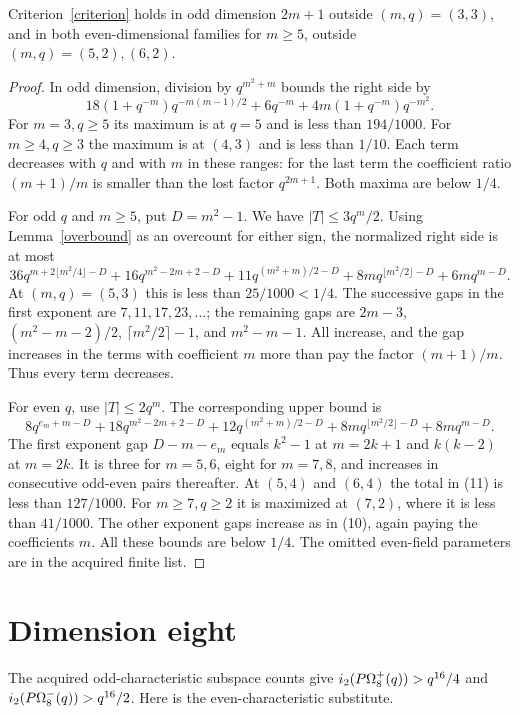 \documentclass[11pt,a4paper]{article}
\begin{document}
\begin{proposition}\label{uniform}
Criterion~\eqref{criterion} holds in odd dimension $2m+1$ outside
$(m,q)=(3,3)$, and in both even-dimensional families for $m\ge5$,
outside $(m,q)=(5,2),(6,2)$.
\end{proposition}
\begin{proof}
In odd dimension, division by $q^{m^2+m}$ bounds the right side by
\[
 18(1+q^{-m})q^{-m(m-1)/2}+6q^{-m}
                 +4m(1+q^{-m})q^{-m^2}.                       \tag{9}
\]
For $m=3,q\ge5$ its maximum is at $q=5$ and is less than $194/1000$.
For $m\ge4,q\ge3$ the maximum is at $(4,3)$ and is less than $1/10$.
Each term decreases with $q$ and with $m$ in these ranges: for the
last term the coefficient ratio $(m+1)/m$ is smaller than the lost
factor $q^{2m+1}$. Both maxima are below $1/4$.

For odd $q$ and $m\ge5$, put $D=m^2-1$. We have $|T|\le3q^m/2$.
Using Lemma~\ref{overbound} as an overcount for either sign, the normalized
right side is at most
\[
 36q^{m+2\lfloor m^2/4\rfloor-D}
 +16q^{m^2-2m+2-D}+11q^{(m^2+m)/2-D}
 +8m q^{\lfloor m^2/2\rfloor-D}+6m q^{m-D}.                  \tag{10}
\]
At $(m,q)=(5,3)$ this is less than $25/1000<1/4$.
The successive gaps in the first exponent are $7,11,17,23,\ldots$;
the remaining gaps are $2m-3$, $(m^2-m-2)/2$,
$\lceil m^2/2\rceil-1$, and $m^2-m-1$.
All increase, and the gap increases in the terms with coefficient $m$
more than pay the factor $(m+1)/m$. Thus every term decreases.

For even $q$, use $|T|\le2q^m$. The corresponding upper bound is
\[
 8q^{e_m+m-D}+18q^{m^2-2m+2-D}+12q^{(m^2+m)/2-D}
 +8m q^{\lfloor m^2/2\rfloor-D}+8m q^{m-D}.                  \tag{11}
\]
The first exponent gap $D-m-e_m$ equals $k^2-1$ at $m=2k+1$
and $k(k-2)$ at $m=2k$. It is three for $m=5,6$, eight for
$m=7,8$, and increases in consecutive odd-even pairs thereafter.
At $(5,4)$ and $(6,4)$ the total in (11) is less than $127/1000$.
For $m\ge7,q\ge2$ it is maximized at $(7,2)$, where it is less
than $41/1000$. The other exponent gaps increase as in (10), again
paying the coefficients $m$. All these bounds are below $1/4$.
The omitted even-field parameters are in the acquired finite list.
\end{proof}

\section{Dimension eight}
The acquired odd-characteristic subspace counts give
$i_2(P\Omega^+_8(q))>q^{16}/4$ and
$i_2(P\Omega^-_8(q))>q^{16}/2$.
Here is the even-characteristic substitute.
\end{document}
